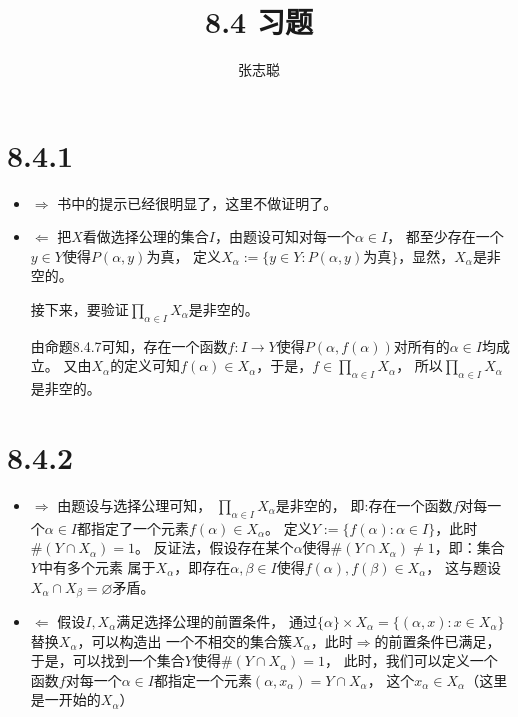 \documentclass{article}
\begin{document}
\title{8.4 习题}
\author{张志聪}
\maketitle

\section*{8.4.1}

\begin{itemize}
  \item $\Rightarrow$ 书中的提示已经很明显了，这里不做证明了。
  \item $\Leftarrow$ 把$X$看做选择公理的集合$I$，由题设可知对每一个$\alpha \in I$，
        都至少存在一个$y \in Y$使得$P(\alpha,y)$为真，
        定义$X_{\alpha} := \{y \in Y : P(\alpha,y) \text{为真}\}$，显然，$X_{\alpha}$是非空的。

        接下来，要验证$\prod \limits_{\alpha \in I} X_\alpha$是非空的。

        由命题8.4.7可知，存在一个函数$f: I \rightarrow Y$使得$P(\alpha,f(\alpha))$对所有的$\alpha \in I$均成立。
        又由$X_{\alpha}$的定义可知$f(\alpha) \in X_{\alpha}$，于是，$f \in \prod \limits_{\alpha \in I} X_\alpha$，
        所以$\prod \limits_{\alpha \in I} X_\alpha$是非空的。
\end{itemize}

\section*{8.4.2}

\begin{itemize}
  \item $\Rightarrow$ 由题设与选择公理可知，
        $\prod \limits_{\alpha \in I} X_{\alpha}$是非空的，
        即:存在一个函数$f$对每一个$\alpha \in I$都指定了一个元素$f(\alpha) \in X_\alpha$。
        定义$Y := \{f(\alpha) : \alpha \in I\}$，此时$\#(Y \cap X_\alpha) = 1$。
        反证法，假设存在某个$\alpha$使得$\#(Y \cap X_\alpha) \neq 1$，即：集合$Y$中有多个元素
        属于$X_\alpha$，即存在$\alpha , \beta \in I$使得$f(\alpha), f(\beta) \in X_\alpha$，
        这与题设$X_\alpha \cap X_\beta = \varnothing$矛盾。
  \item $\Leftarrow$ 假设$I, X_\alpha$满足选择公理的前置条件，
        通过$\{\alpha\} \times X_\alpha = \{(\alpha, x) : x \in X_\alpha \}$替换$X_\alpha$，可以构造出
        一个不相交的集合簇$X_\alpha$，此时$\Rightarrow$的前置条件已满足，
        于是，可以找到一个集合$Y$使得$\#(Y \cap X_\alpha) = 1$，
        此时，我们可以定义一个函数$f$对每一个$\alpha \in I$都指定一个元素$(\alpha, x_\alpha) = Y \cap X_\alpha$，
        这个$x_\alpha \in X_\alpha$（这里是一开始的$X_\alpha$）
\end{itemize}
\end{document}
